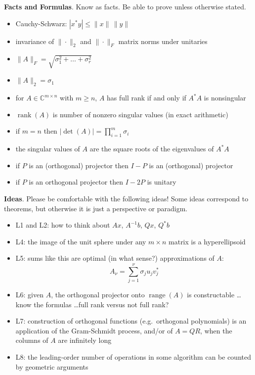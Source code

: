 \documentclass[11pt]{amsart}
\newcommand{\normalspacing}{\renewcommand{\baselinestretch}{1.1}\tiny\normalsize}
\newcommand{\bigspacing}{\renewcommand{\baselinestretch}{1.21}\tiny\normalsize}
\newcommand{\CC}{{\mathbb{C}}}
\newcommand{\rank}{\operatorname{rank}}
\newcommand{\range}{\operatorname{range}}
\begin{document}
\newpage\noindent \textbf{Facts and Formulas}.  Know as facts.  Be able to prove unless otherwise stated.
\begin{itemize}
\item Cauchy-Schwarz: $|x^* y| \le \|x\|\,\|y\|$ 
\item invariance of $\|\cdot\|_2$ and $\|\cdot\|_F$ matrix norms under unitaries
\item $\|A\|_F = \sqrt{\sigma_1^2 + \dots + \sigma_r^2}$
\item $\|A\|_2 = \sigma_1$
\item for $A\in \CC^{m\times n}$ with $m\ge n$, $A$ has full rank if and only if $A^* A$ is nonsingular
\item $\rank(A)$ is number of nonzero singular values (in exact arithmetic)
\item if $m=n$ then $|\det(A)|=\prod_{i=1}^m \sigma_i$
\item the singular values of $A$ are the square roots of the eigenvalues of $A^*A$
\item if $P$ is an (orthogonal) projector then $I-P$ is an (orthogonal) projector
\item if $P$ is an orthogonal projector then $I-2P$ is unitary
\end{itemize}

\normalspacing

\bigskip\noindent \textbf{Ideas}.  Please be comfortable with the following ideas!  Some ideas correspond to theorems, but otherwise it is just a perspective or paradigm.

\bigspacing
\begin{itemize}
\item L1 and L2: how to think about $Ax$, $A^{-1}b$, $Qx$, $Q^* b$
\item L4: the image of the unit sphere under any $m\times n$ matrix is a hyperellipsoid
\item L5: sums like this are optimal (in what sense?) approximations of $A$:
	$$A_\nu = \sum_{j=1}^\nu \sigma_j u_j v_j^*$$
\item L6: given $A$, the orthogonal projector onto $\range(A)$ is constructable \dots know the formulas \dots full rank versus not full rank?
\item L7: construction of orthogonal functions (e.g.~orthogonal polynomials) is an application of the Gram-Schmidt process, and/or of $A=QR$, when the columns of $A$ are infinitely long
\item L8: the leading-order number of operations in some algorithm can be counted by geometric arguments
\end{itemize}
\end{document}
